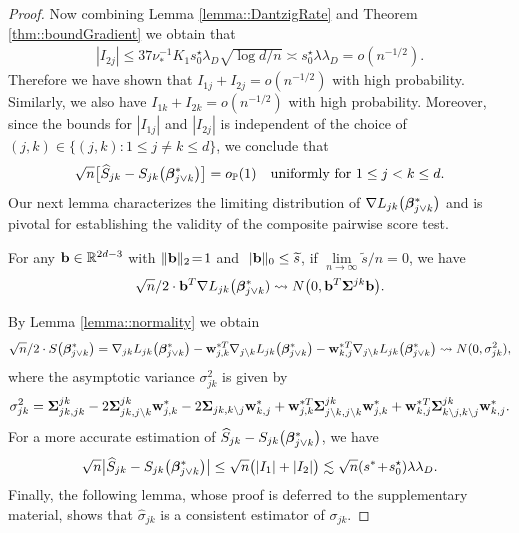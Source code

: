 \documentclass[twoside,11pt]{article}
\newcommand*{\BR}{\mathbb{R}}
\newcommand*{\bbetas}{\bbeta^*}
\newcommand*{\gradstarst} {\nabla L_{jk}\bigl(\bbeta_{j\vee k}^*\bigr)}
\newcommand*{\sw}{\wb^*}
\newcommand*{\limn}{\lim \limits_{n\rightarrow \infty} }
\begin{document}
\begin{proof}
Now combining  Lemma \ref{lemma::DantzigRate} and Theorem \ref{thm::boundGradient} we obtain that 
\begin{align*}%
| I_{2j} | \leq 37 \nu_*^{-1}K_1 s_0^\star \lambda_{D}\sqrt{\log d/n}\asymp s_0^\star \lambda \lambda_D = o(n^{-1/2}).
\end{align*}
Therefore we have shown that $I_{1j} + I_{2j} = o(n^{-1/2})$ with high probability. Similarly, we also have $I_{1k} + I_{2k} = o(n^{-1/2})$  with high probability.
Moreover, since the bounds for $|I_{1j}|$ and $|I_{2j}|$ is independent of the choice of $(j,k)\in\{ (j,k)\colon 1\leq j\neq k\leq d\}$, we conclude that  
 $$
\sqrt{n} \bigl [\hat{S}_{jk}- S_{jk}\bigl(\bbetas_{j\vee k}\bigr) \bigr]= o_{\PP}(1) \quad \text{uniformly for } 1\leq j < k \leq d.
 $$
 Our next lemma characterizes the limiting distribution of $\gradstarst$ and is pivotal for establishing the validity of the composite pairwise score test.
\begin{lemma}\label{lemma::normality}
For any $\bbb \in \BR^{2d-3}$  with $\| \mathbf{b} \|_2 \!=\! 1$ and $ \ | \mathbf{b}   \|_0 \leq \widetilde s$,  if $\limn \tilde s \big / n\!=\! 0$, we have 
\begin{align}\label{equ::gradNormality}
\sqrt{n}/2 \cdot \bbb^T \nabla L_{jk}\bigl(\bbetas_{j \vee k}) \leadsto N\bigl(0, \bbb^T \bSigma^{jk}  \bbb\bigr).
\end{align}
\end{lemma}

By Lemma \ref{lemma::normality} we obtain
 \begin{align*}
  \sqrt {n}/2\cdot  S\bigl(\bbetas_{j\vee k}\bigr) =\nabla_{jk} L_{jk}\bigl(\bbetas_{j\vee k}\bigr) - {\sw_{j,k}}\!\!\!\! ^T \nabla_{j\setminus k} L_{jk}\bigl(\bbetas_{j\vee k}\bigr) - {\sw_{k,j}}\!\!\!\! ^T \nabla_{j\setminus k} L_{jk}\bigl(\bbetas_{j\vee k}\bigr) \leadsto N(0,\sigma_{jk}^2),
  \end{align*}
where the asymptotic variance $\sigma_{jk}^2$ is given by
 $$\sigma_{jk}^2 = \bSigma^{jk}_{jk,jk} - 2 \bSigma_{jk,j\setminus k}^{jk} \sw_{j,k} -2 \bSigma_{jk,k\setminus j} \sw_{k,j}  + {\sw_{j,k}}\!\!\!\!^T \bSigma_{j\setminus k,j\setminus k} ^{jk}\sw_{j,k} + {\sw_{k,j} }\!\!\!\!^T \bSigma_{k\setminus j,k\setminus j} ^{jk}\sw_{k,j} .$$
 For a more accurate estimation of  $\hat{S}_{jk}- S_{jk}\bigl(\bbetas_{j\vee k}\bigr) $, we have
 \begin{align}\label{equ::UniformConvSbbeta}
\sqrt{n} \bigl |\hat{S}_{jk}- S_{jk}\bigl(\bbetas_{j\vee k}\bigr) \bigr|\leq \sqrt{n} \bigl (   |I_1| +  |I_2| \bigr) \lesssim \sqrt{n} (s^*\! +\! s_0^\star) \lambda \lambda_D . 
\end{align}
 Finally, the following lemma, whose proof is deferred to the supplementary material, shows that $\hat\sigma_{jk} $ is a consistent estimator of $\sigma_{jk}$.
 

\end{proof}
\end{document}
